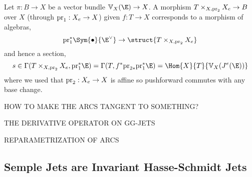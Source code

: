 \documentclass[12pt]{article}
\begin{document}
\begin{example}
Let $\pi : B \to X$ be a vector bundle $\VV_X(\E) \to X$. A morphism $T \times_{X, \mathrm{pr}_2} X_e \to B$ over $X$ (through $\mathrm{pr}_1 : X_e \to X$) given $f : T \to X$ corresponds to a morphism of algebras,
\[ \pr_1^* \Sym{\bullet}{\E^\vee} \to \struct{T \times_{X, \pr_2} X_e} \]
and hence a section,
\[ s \in \Gamma(T \times_{X, \pr_2} X_e, \pr_1^* \E) = \Gamma(T, f^* \pr_{2*} \pr_1^* \E) = \Hom{X}{T}{\VV_X(J^e(\E))} \]
where we used that $\mathrm{pr}_2 : X_e \to X$ is affine so pushforward commutes with any base change. 
\end{example}

HOW TO MAKE THE ARCS TANGENT TO SOMETHING?

THE DERIVATIVE OPERATOR ON GG-JETS

REPARAMETRIZATION OF ARCS

\subsection{Semple Jets are Invariant Hasse-Schmidt Jets}

\newcommand{\aff}{\mathrm{aff}}
\end{document}

